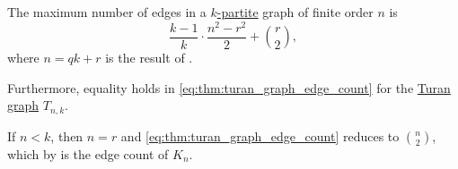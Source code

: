\begin{proposition}\label{thm:turan_graph_edge_count}
  The maximum number of edges in a \hyperref[def:multipartite_graph]{\( k \)-partite} graph of finite order \( n \) is
  \begin{equation}\label{eq:thm:turan_graph_edge_count}
    \frac {k - 1} k \cdot \frac {n^2 - r^2} 2 + \binom r 2,
  \end{equation}
  where \( n = qk + r \) is the result of .

  Furthermore, equality holds in \eqref{eq:thm:turan_graph_edge_count} for the \hyperref[def:turan_graph]{Turan graph} \( T_{n,k} \).
\end{proposition}
\begin{comments}
  \item If \( n < k \), then \( n = r \) and \eqref{eq:thm:turan_graph_edge_count} reduces to \( \binom n 2 \), which by  is the edge count of \( K_n \).
\end{comments}
